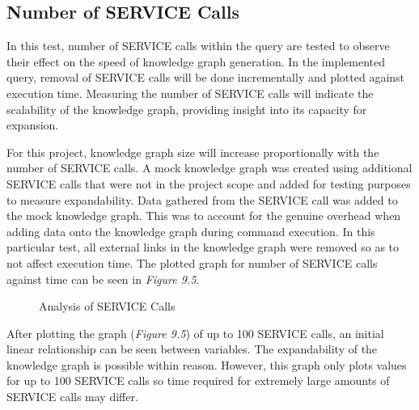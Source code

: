 \subsection{Number of SERVICE Calls}
\hspace{0.5cm} In this test, number of SERVICE calls within the query are tested to observe their effect on the speed of knowledge graph generation. In the implemented query, removal of SERVICE calls will be done incrementally and plotted against execution time. Measuring the number of SERVICE calls will indicate the scalability of the knowledge graph, providing insight into its capacity for expansion.

For this project, knowledge graph size will increase proportionally with the number of SERVICE calls. A mock knowledge graph was created using additional SERVICE calls that were not in the project scope and added for testing purposes to measure expandability. Data gathered from the SERVICE call was added to the mock knowledge graph. This was to account for the genuine overhead when adding data onto the knowledge graph during command execution. In this particular test, all external links in the knowledge graph were removed so as to not affect execution time. The plotted graph for number of SERVICE calls against time can be seen in \textit{Figure 9.5}.

\begin{figure}[H]
\begin{center}
\end{center}
\vspace{-0.75cm}
\caption{Analysis of SERVICE Calls}
\end{figure}

After plotting the graph (\textit{Figure 9.5}) of up to 100 SERVICE calls, an initial linear relationship can be seen between variables. The expandability of the knowledge graph is possible within reason. However, this graph only plots values for up to 100 SERVICE calls so time required for extremely large amounts of SERVICE calls may differ. 
